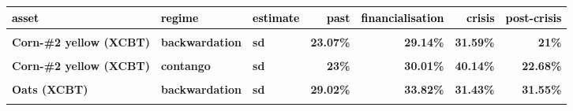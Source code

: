 \documentclass[
  authoryear,
  preprint,
  3p]{elsarticle}
\begin{document}
\begin{longtable}[t]{>{}l>{}l>{}l>{}r>{}r>{}r>{}r}
\toprule
\textcolor{black}{\textbf{asset}} & \textcolor{black}{\textbf{regime}} & \textcolor{black}{\textbf{estimate}} & \textcolor{black}{\textbf{past}} & \textcolor{black}{\textbf{financialisation}} & \textcolor{black}{\textbf{crisis}} & \textcolor{black}{\textbf{post-crisis}}\\
\midrule
\textbf{\cellcolor{gray!10}{Corn-\#2 yellow (XCBT)}} & \textbf{\cellcolor{gray!10}{backwardation}} & \textbf{\cellcolor{gray!10}{mean}} & \textcolor[HTML]{4285f4}{\textbf{\cellcolor{gray!10}{-4.86\%}}} & \textcolor[HTML]{4285f4}{\textbf{\cellcolor{gray!10}{19.26\%}}} & \textcolor[HTML]{4285f4}{\textbf{\cellcolor{gray!10}{20.48\%}}} & \textcolor[HTML]{4285f4}{\textbf{\cellcolor{gray!10}{-8.74\%}}}\\
\textbf{Corn-\#2 yellow (XCBT)} & \textbf{backwardation} & \textbf{sd} & \textcolor[HTML]{4285f4}{\textbf{23.07\%}} & \textcolor[HTML]{4285f4}{\textbf{29.14\%}} & \textcolor[HTML]{4285f4}{\textbf{31.59\%}} & \textcolor[HTML]{4285f4}{\textbf{21\%}}\\
\textbf{\cellcolor{gray!10}{Corn-\#2 yellow (XCBT)}} & \textbf{\cellcolor{gray!10}{contango}} & \textbf{\cellcolor{gray!10}{mean}} & \textcolor[HTML]{4285f4}{\textbf{\cellcolor{gray!10}{11.3\%}}} & \textcolor[HTML]{4285f4}{\textbf{\cellcolor{gray!10}{23.54\%}}} & \textcolor[HTML]{4285f4}{\textbf{\cellcolor{gray!10}{-4.43\%}}} & \textcolor[HTML]{4285f4}{\textbf{\cellcolor{gray!10}{0.78\%}}}\\
\textbf{Corn-\#2 yellow (XCBT)} & \textbf{contango} & \textbf{sd} & \textcolor[HTML]{4285f4}{\textbf{23\%}} & \textcolor[HTML]{4285f4}{\textbf{30.01\%}} & \textcolor[HTML]{4285f4}{\textbf{40.14\%}} & \textcolor[HTML]{4285f4}{\textbf{22.68\%}}\\
\textbf{\cellcolor{gray!10}{Oats (XCBT)}} & \textbf{\cellcolor{gray!10}{backwardation}} & \textbf{\cellcolor{gray!10}{mean}} & \textcolor[HTML]{4285f4}{\textbf{\cellcolor{gray!10}{-5.39\%}}} & \textcolor[HTML]{4285f4}{\textbf{\cellcolor{gray!10}{7.82\%}}} & \textcolor[HTML]{4285f4}{\textbf{\cellcolor{gray!10}{7.85\%}}} & \textcolor[HTML]{4285f4}{\textbf{\cellcolor{gray!10}{2.56\%}}}\\
\addlinespace
\textbf{Oats (XCBT)} & \textbf{backwardation} & \textbf{sd} & \textcolor[HTML]{4285f4}{\textbf{29.02\%}} & \textcolor[HTML]{4285f4}{\textbf{33.82\%}} & \textcolor[HTML]{4285f4}{\textbf{31.43\%}} & \textcolor[HTML]{4285f4}{\textbf{31.55\%}}\\
\textbf{\cellcolor{gray!10}{Oats (XCBT)}} & \textbf{\cellcolor{gray!10}{contango}} & \textbf{\cellcolor{gray!10}{mean}} & \textcolor[HTML]{4285f4}{\textbf{\cellcolor{gray!10}{16.95\%}}} & \textcolor[HTML]{4285f4}{\textbf{\cellcolor{gray!10}{*35.38\%}}} & \textcolor[HTML]{4285f4}{\textbf{\cellcolor{gray!10}{11.68\%}}} & \textcolor[HTML]{4285f4}{\textbf{\cellcolor{gray!10}{-3.17\%}}}\\

\end{longtable}
\end{document}
